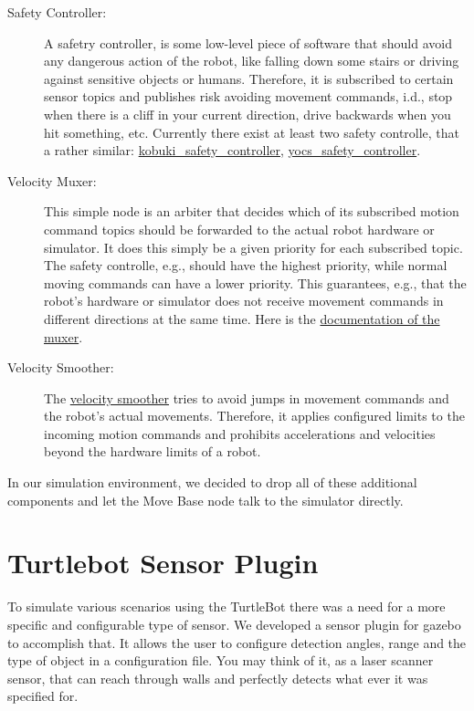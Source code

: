 \begin{description}
  \item[Safety Controller:] A safetry controller, is some low-level piece of software that should avoid any dangerous action of the robot, like falling down some stairs or driving against sensitive objects or humans. Therefore, it is subscribed to certain sensor topics and publishes risk avoiding movement commands, i.d., stop when there is a cliff in your current direction, drive backwards when you hit something, etc. Currently there exist at least two safety controlle, that a rather similar: \href{http://wiki.ros.org/kobuki_safety_controller}{kobuki\_safety\_controller}, \href{http://wiki.ros.org/yocs_safety_controller}{yocs\_safety\_controller}.
  \item[Velocity Muxer:] This simple node is an arbiter that decides which of its subscribed motion command topics should be forwarded to the actual robot hardware or simulator. It does this simply be a given priority for each subscribed topic. The safety controlle, e.g., should have the highest priority, while normal moving commands can have a lower priority. This guarantees, e.g., that the robot's hardware or simulator does not receive movement commands in different directions at the same time. Here is the \href{http://wiki.ros.org/cmd_vel_mux}{documentation of the muxer}.
  \item[Velocity Smoother:] The \href{http://wiki.ros.org/yocs_velocity_smoother}{velocity smoother} tries to avoid jumps in movement commands and the robot's actual movements. Therefore, it applies configured limits to the incoming motion commands and prohibits accelerations and velocities beyond the hardware limits of a robot. 
\end{description}

In our simulation environment, we decided to drop all of these additional components and let the Move Base node talk to the simulator directly.

\section{Turtlebot Sensor Plugin}

To simulate various scenarios using the TurtleBot there was a need for a more specific and configurable type of sensor. We developed a sensor plugin for gazebo to accomplish that. It allows the user to configure detection angles, range and the type of object in a configuration file. You may think of it, as a laser scanner sensor, that can reach through walls and perfectly detects what ever it was specified for.


